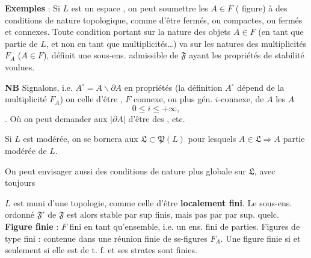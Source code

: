 \documentclass[11pt,a4paper]{article}
\begin{document}
\textbf{Exemples} : Si $L$ est un espace , \struck{\ill{}} on peut soumettre les $A \in F$ \struck{\ill{}} ( figure) à des conditions de nature topologique, comme d'être fermés, ou \struck{\ill{}} compactes, ou fermés et connexes. Toute condition portant sur la nature des objets $A \in F$ (en tant que partie de $L$, et non en tant que multiplicités…) va  sur les natures des multiplicités $F_A$ ($A \in F$), définit une sous-ens. admissible de $\mathfrak{F}$ ayant les propriétés de stabilité voulues.

\textbf{NB} Signalons, i.e. $A^{\circ} = A \smallsetminus \partial A$ en propriétés \struck{\ill{}} (la définition  $A^{\circ}$ dépend de la multiplicité $F_A$) on  celle d'être  , \ill{}  $F$ \ill{}  connexe, ou plus gén. $i$-connexe, \ill{} de $A$  les $A$ \ill{} 
\[
  0 \leq i \leq +\infty ,
\]
 . Où on peut demander aux $|\partial A|$ d'être des  , etc.


Si $L$ est  \add{\uncertain{\ill{}} \ill{}} modérée, on se bornera aux $\mathfrak{L} \subset \mathfrak{P}(L)$ pour lesquels $A \in \mathfrak{L} \Rightarrow A$ partie modérée de $L$.

On peut envisager aussi des conditions de nature plus globale sur $\mathfrak{L}$, avec toujours

$L$ est muni d'une topologie, comme celle d'être \textbf{localement fini}. Le sous-ens. ordonné $\mathfrak{F}'$ \struck{\ill{}} de $\mathfrak{F}$ est alors stable par sup finis, mais pas par  par sup. quelc. \textbf{Figure finie} : \struck{\ill{}} $F$ fini en tant qu'ensemble, i.e. un ens. fini de parties. Figures de type fini : contenue dans une réunion finie de ss-figures $F_A$.  Une figure  finie \struck{\ill{}} si et seulement si elle est de t. f. et ses strates sont finies.
\end{document}
